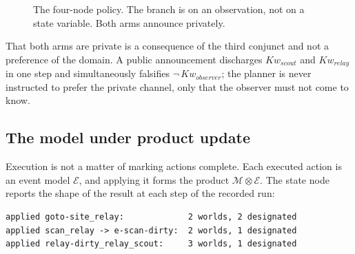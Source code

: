 \documentclass[11pt,a4paper]{article}
\theoremstyle{definition}
\newcommand{\Mod}{\mathcal{M}}
\newcommand{\Ev}{\mathcal{E}}
\newcommand{\prd}{\otimes}
\newcommand{\Kw}[1]{\mathit{Kw}_{#1}}
\begin{document}
\begin{figure}[H]
\centering
{}
\caption{The four-node policy. The branch is on an observation, not on a state variable. Both arms announce privately.}
\label{fig:policy}
\end{figure}

That both arms are private is a consequence of the third conjunct and not a
preference of the domain. A public announcement discharges
$\Kw{\mathit{scout}}$ and $\Kw{\mathit{relay}}$ in one step and simultaneously
falsifies $\neg\,\Kw{\mathit{observer}}$; the planner is never instructed to
prefer the private channel, only that the observer must not come to know.

\subsection{The model under product update}

Execution is not a matter of marking actions complete. Each executed action is an event model $\Ev$, and applying it forms the product $\Mod \prd \Ev$. The
state node reports the shape of the result at each step of the recorded run:

\begin{lstlisting}
applied goto-site_relay:             2 worlds, 2 designated
applied scan_relay -> e-scan-dirty:  2 worlds, 1 designated
applied relay-dirty_relay_scout:     3 worlds, 1 designated
\end{lstlisting}
\end{document}
